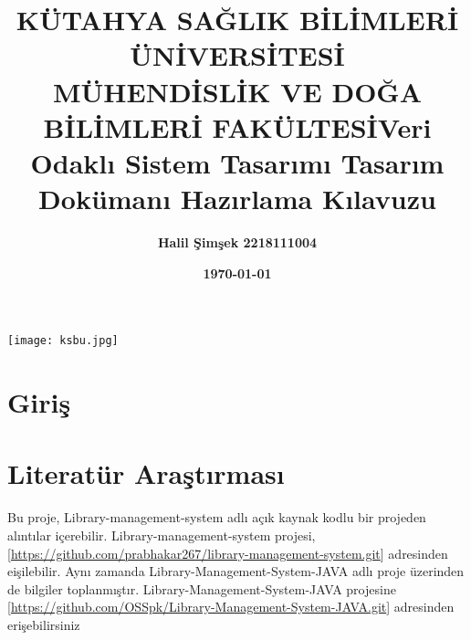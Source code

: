 \documentclass[12pt, a4paper]{article}
\title{\bf\fontsize{12pt}{14pt}\selectfont KÜTAHYA SAĞLIK BİLİMLERİ ÜNİVERSİTESİ \\ MÜHENDİSLİK VE DOĞA BİLİMLERİ FAKÜLTESİ}
\date{}
\begin{document}
	\maketitle

	\begin{center}
		\texttt{[image: ksbu.jpg]}
	\end{center}
	
	
	\begin{center}
		\vspace{1cm} 
	\end{center}
	\begin{center}
		\title{\bf\fontsize{12pt}{14pt}\selectfont Veri Odaklı Sistem Tasarımı }
	\end{center}
	\begin{center}
		\title{\bf\fontsize{12pt}{14pt}\selectfont Tasarım Dokümanı Hazırlama Kılavuzu}
	\end{center}
	\begin{center}
		\vspace{1cm} %
	\end{center}
	\begin{center}
		
		
		\author{\bf\fontsize{12pt}{14pt}Halil Şimşek \hspace{1.5cm}2218111004}
		
		\begin{center}
			\vspace{1cm} 
		\end{center}
		\date{\textbf{\today}}
	\end{center}
	\newpage

\section{Giriş}


\section{Literatür Araştırması}
Bu proje, Library-management-system adlı açık kaynak kodlu bir projeden alıntılar içerebilir. Library-management-system projesi, [\url{https://github.com/prabhakar267/library-management-system.git}]
adresinden eişilebilir. \newline
Aynı zamanda Library-Management-System-JAVA adlı proje üzerinden de bilgiler toplanmıştır. Library-Management-System-JAVA
projesine [\url{https://github.com/OSSpk/Library-Management-System-JAVA.git}] adresinden erişebilirsiniz
\end{document}
